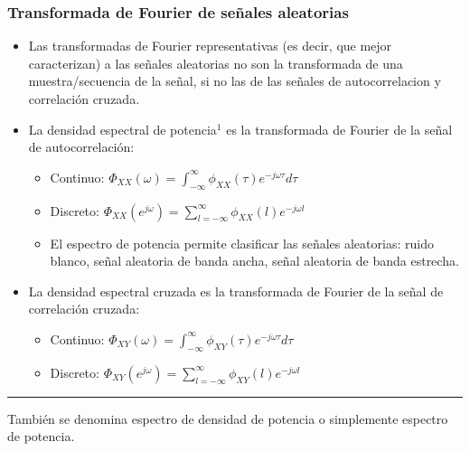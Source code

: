 \documentclass{beamer}
\numberwithin{section}{part}
\begin{document}
\begin{frame}
  \frametitle{Transformada de Fourier de señales aleatorias}
  \vspace{-0.2cm}
  \footnotesize
  \begin{itemize}
    \footnotesize
    \item Las transformadas de Fourier representativas (es decir, que mejor caracterizan) a las señales aleatorias no son la transformada de una muestra/secuencia de la señal, si no  las de las señales de autocorrelacion y correlación cruzada.
    \item \alert{La densidad espectral de potencia}$^1$  es la transformada de Fourier de la señal de autocorrelación: 
    \begin{itemize}
      \footnotesize  
      \item Continuo: $\Phi_{XX}(\omega)=\int_{-\infty}^{\infty} \phi_{XX}(\tau)e^{-j\omega\tau}d\tau$
      \vspace{0.1cm}
      \item Discreto: $\Phi_{XX}(e^{j\omega})=\sum_{l=-\infty}^{\infty} \phi_{XX}(l)e^{-j\omega l}$
      \vspace{0.1cm}    
      \item El espectro de potencia permite clasificar las señales aleatorias: ruido blanco, señal aleatoria de banda ancha, señal aleatoria de banda estrecha. 
    \end{itemize}
    \item \alert{La densidad espectral cruzada} es la transformada de Fourier de la señal de correlación cruzada:
    \begin{itemize}
      \footnotesize
      \item Continuo: $\Phi_{XY}(\omega)=\int_{-\infty}^{\infty} \phi_{XY}(\tau)e^{-j\omega\tau}d\tau$      
      \vspace{0.1cm}      
      \item Discreto: $\Phi_{XY}(e^{j\omega})=\sum_{l=-\infty}^{\infty} \phi_{XY}(l)e^{-j\omega l}$      
      \vspace{0.1cm}      
    \end{itemize}
  \end{itemize}
    
  \rule{11cm}{0.04ex}
  \scriptsize
  También se denomina espectro de densidad de potencia o simplemente espectro de potencia.
  
\end{frame}  
  
\end{document}

